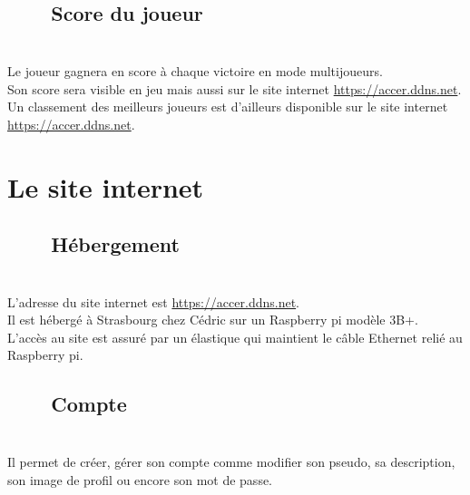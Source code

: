 \documentclass[titlepage, 13px, a4paper]{report}
\begin{document}
\subsection[Score du joueur]{~~~~Score du joueur}
\paragraph{} \hspace{0pt} \\
Le joueur gagnera en score à chaque victoire en mode multijoueurs. \\
Son score sera visible en jeu mais aussi sur le site internet \url{https://accer.ddns.net}. \\
Un classement des meilleurs joueurs est d’ailleurs disponible sur le site internet \url{https://accer.ddns.net}. \\


\newpage

\section{Le site internet}
\subsection[Hébergement]{~~~~Hébergement}
\paragraph{} \hspace{0pt} \\
L'adresse du site internet est \url{https://accer.ddns.net}. \\
Il est hébergé à Strasbourg chez Cédric sur un Raspberry pi modèle 3B+. \\
L’accès au site est assuré par un élastique qui maintient le câble Ethernet relié au Raspberry pi. \\

\subsection[Compte]{~~~~Compte}
\paragraph{} \hspace{0pt} \\
Il permet de créer, gérer son compte comme modifier son pseudo, sa description, son image de profil ou encore son mot de passe. \\
\end{document}
